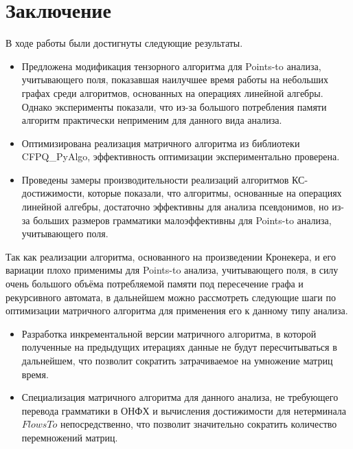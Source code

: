 \section*{Заключение}
В ходе работы были достигнуты следующие результаты.
\begin{itemize}
    \item Предложена модификация тензорного алгоритма для Points-to анализа, учитывающего поля, показавшая наилучшее время работы на небольших графах среди алгоритмов, основанных на операциях линейной алгебры. Однако эксперименты показали, что из-за большого потребления памяти алгоритм практически неприменим для данного вида анализа.
    \item Оптимизирована реализация матричного алгоритма из библиотеки CFPQ\_PyAlgo, эффективность оптимизации экспериментально проверена.
    \item Проведены замеры производительности реализаций алгоритмов КС-достижимости, которые показали, что алгоритмы, основанные на операциях линейной алгебры, достаточно эффективны для анализа псевдонимов, но из-за больших размеров грамматики малоэффективны для Points-to анализа, учитывающего поля.
\end{itemize}

Так как реализации алгоритма, основанного на произведении Кронекера, и его вариации плохо применимы для Points-to анализа, учитывающего поля, в силу очень большого объёма потребляемой памяти под пересечение графа и рекурсивного автомата, в дальнейшем можно рассмотреть следующие шаги по оптимизации матричного алгоритма для применения его к данному типу анализа.
\begin{itemize}
    \item Разработка инкрементальной версии матричного алгоритма, в которой полученные на предыдущих итерациях данные не будут пересчитываться в дальнейшем, что позволит сократить затрачиваемое на умножение матриц время.
    \item Специализация матричного алгоритма для данного анализа, не требующего перевода грамматики в ОНФХ и вычисления достижимости для нетерминала $FlowsTo$ непосредственно, что позволит значительно сократить количество перемножений матриц.
\end{itemize}
